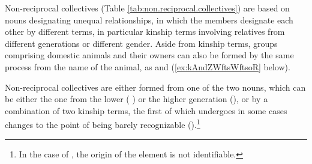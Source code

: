 Non-reciprocal collectives (Table \ref{tab:non.reciprocal.collectives}) are based on nouns designating unequal relationships, in which the members designate each other by different terms, in particular kinship terms involving relatives from different generations or different gender.  Aside from kinship terms, groups comprising domestic animals and their owners can also be formed by the same process from the name of the animal, as  and  (\ref{ex:kAndZWftsWftsoR} below).

Non-reciprocal collectives are either formed from one of the two nouns, which can be either the one from the lower ( ) or the higher generation (), or by a combination of two kinship terms, the first of which undergoes in some cases changes to the point of being barely recognizable ().\footnote{In the case of , the origin of the element  is not identifiable.}

